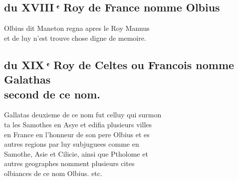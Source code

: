 \documentclass[12pt]{article}
\begin{document}
\subsection*{du XVIII ͤ Roy de France nomme Olbius}


Olbius dit Maneton regna apres le Roy Mannus\\
et de luy n'est trouve chose digne de memoire.





\subsection*{du XIX ͤ Roy de Celtes ou Francois nomme Galathas\\
second de ce nom.}


Gallatas deuxieme de ce nom fut celluy
          qui surmon\\
ta les Samothes en Asye et edifia plusieurs villes\\
en
          France en l'honneur de son pere Olbius et es\\
autres regions par luy subjuguees comme en\\
Samothe, Asie et Cilicie, ainsi que
            Ptholome et\\
autres geographes nomment
          plusieurs cites\\
olbiances de ce nom Olbius.
          etc.
\end{document}
